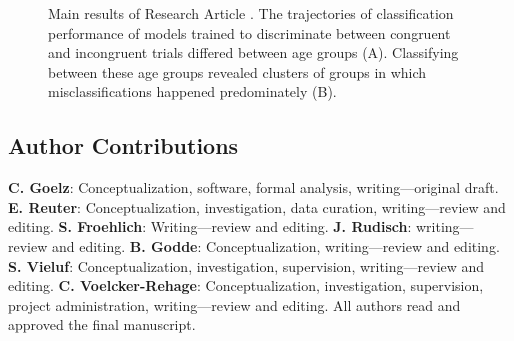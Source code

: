 \begin{figure}[h]
\begin{center}

\caption[Main results of Research Article .]{Main results of Research Article . The trajectories of classification performance of models trained to discriminate between congruent and incongruent trials differed between age groups (A). Classifying between these age groups revealed clusters of groups in which misclassifications happened predominately (B).}
\label{fig:results2}
\end{center}
\end{figure}

\subsection*{Author Contributions}
\textbf{C. Goelz}: Conceptualization, software, formal analysis, writing—original draft.
\textbf{E. Reuter}: Conceptualization, investigation, data curation, writing—review and editing.
\textbf{S. Froehlich}: Writing—review and editing. 
\textbf{J. Rudisch}: writing—review and editing.
\textbf{B. Godde}: Conceptualization, writing—review and editing.
\textbf{S. Vieluf}: Conceptualization, investigation, supervision, writing—review and editing.
\textbf{C. Voelcker-Rehage}: Conceptualization, investigation, supervision, project administration, writing—review and editing. All authors read and approved the final manuscript.
